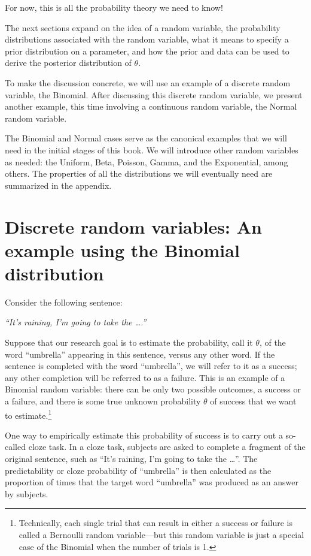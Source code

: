 \documentclass[12pt,]{krantz}
\theoremstyle{definition}
\theoremstyle{definition}
\theoremstyle{definition}
\theoremstyle{remark}
\begin{document}
For now, this is all the probability theory we need to know!

The next sections expand on the idea of a random variable, the probability distributions associated with the random variable, what it means to specify a prior distribution on a parameter, and how the prior and data can be used to derive the posterior distribution of \(\theta\).

To make the discussion concrete, we will use an example of a discrete random variable, the Binomial. After discussing this discrete random variable, we present another example, this time involving a continuous random variable, the Normal random variable.

The Binomial and Normal cases serve as the canonical examples that we will need in the initial stages of this book. We will introduce other random variables as needed: the Uniform, Beta, Poisson, Gamma, and the Exponential, among others. The properties of all the distributions we will eventually need are summarized in the appendix.

\hypertarget{sec:binomialcloze}{%
\section{Discrete random variables: An example using the Binomial distribution}\label{sec:binomialcloze}}

Consider the following sentence:

\emph{``It's raining, I'm going to take the \ldots{}.''}

Suppose that our research goal is to estimate the probability, call it \(\theta\), of the word ``umbrella'' appearing in this sentence, versus any other word. If the sentence is completed with the word ``umbrella'', we will refer to it as a success; any other completion will be referred to as a failure. This is an example of a Binomial random variable: there can be only two possible outcomes, a success or a failure, and there is some true unknown probability \(\theta\) of success that we want to estimate.\footnote{Technically, each single trial that can result in either a success or failure is called a Bernoulli random variable---but this random variable is just a special case of the Binomial when the number of trials is 1.}

One way to empirically estimate this probability of success is to carry out a so-called cloze task. In a cloze task, subjects are asked to complete a fragment of the original sentence, such as ``It's raining, I'm going to take the \ldots{}''. The predictability or cloze probability of ``umbrella'' is then calculated as the proportion of times that the target word ``umbrella'' was produced as an answer by subjects.
\end{document}
